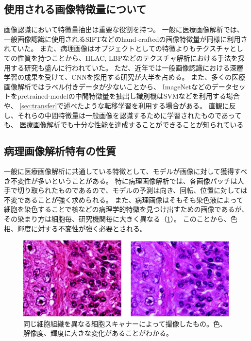 \subsection{使用される画像特徴量について}
画像認識において特徴量抽出は重要な役割を持つ。
一般に医療画像解析では、一般画像認識に使用されるSIFTなどのhand-craftedの画像特徴量が同様に利用されていた\cite{caicedo2009histopathology}。
また、病理画像はオブジェクトとしての特徴よりもテクスチャとしての性質を持つことから、HLAC, LBPなどのテクスチャ解析における手法を採用する研究も盛んに行われていた\cite{sertel2008texture, sertel2009histopathological, nosato2011extended}。
ただ、近年では一般画像認識における深層学習の成果を受けて、CNNを採用する研究が大半を占める。
また、多くの医療画像解析ではラベル付きデータが少ないことから、
ImageNetなどのデータセットをpretrained-modelの中間特徴量を抽出し識別機はSVMなどを利用する場合や、
\ref{sec:transfer}で述べたような転移学習を利用する場合がある。
直観に反し、それらの中間特徴量は一般画像を認識するために学習されたものであっても、
医療画像解析でも十分な性能を達成することができることが知られている\cite{li2014medical, tajbakhsh2016convolutional}

\subsection{病理画像解析特有の性質}
一般に医療画像解析に共通している特徴として、モデルが画像に対して獲得すべき不変性が多いということがある。
特に病理画像解析では、各画像パッチは人手で切り取られたものであるので、モデルの予測は向き、回転、位置に対しては不変であることが強く求められる。
また、病理画像はそもそも染色液によって細胞を染色することで核などの病理学的特徴を見つけ出すための画像であるが、
その染まり方は細胞毎、研究機関毎に大きく異なる（\ref{fig:comparison_color}）。
このことから、色相、輝度に対する不変性が強く必要とされる。

\begin{figure}[tbp]
    \label{fig:comparison_color}
     \begin{center}
      \includegraphics[width=13cm]{figures/comparison_color.pdf}
     \end{center}
    \caption{同じ細胞組織を異なる細胞スキャナーによって撮像したもの。色、解像度、輝度に大きな変化があることがわかる。}
\end{figure}

